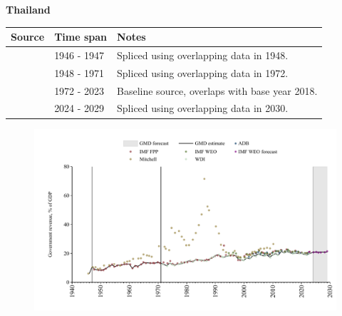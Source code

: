 \documentclass[12pt,a4paper,landscape]{article}
\begin{document}
\begin{adjustbox}{max totalsize={\paperwidth}{\paperheight},center}
\begin{minipage}[t][\textheight][t]{\textwidth}
\vspace*{0.5cm}
{}
\begin{center}
{\Large\bfseries Thailand}
\end{center}
\vspace{0.5cm}
\begin{table}[H]
\centering
\small
\begin{tabular}{|l|l|l|}
\hline
\textbf{Source} & \textbf{Time span} & \textbf{Notes} \\
\hline
\rowcolor{white}\cite{Mitchell}& 1946 - 1947 &Spliced using overlapping data in 1948.\\
\rowcolor{lightgray}\cite{IMF_FPP}& 1948 - 1971 &Spliced using overlapping data in 1972.\\
\rowcolor{white}\cite{WDI}& 1972 - 2023 &Baseline source, overlaps with base year 2018.\\
\rowcolor{lightgray}\cite{IMF_WEO_forecast}& 2024 - 2029 &Spliced using overlapping data in 2030.\\
\hline
\end{tabular}
\end{table}
\begin{figure}[H]
\centering
\includegraphics[width=\textwidth,height=0.6\textheight,keepaspectratio]{graphs/THA_govrev_GDP.pdf}
\end{figure}
\end{minipage}
\end{adjustbox}
\end{document}
